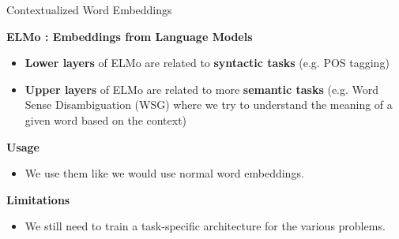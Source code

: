 \documentclass[aspectratio=169]{beamer}
\begin{document}
\begin{frame}{Contextualized Word Embeddings}

\centering
\textbf{ELMo : Embeddings from Language Models \cite{peters2018deep}}
\vspace{.3cm}

\begin{itemize}
	\item \textbf{Lower layers} of ELMo are related to \textbf{syntactic tasks} (e.g. POS tagging)
	\item \textbf{Upper layers} of ELMo are related to more \textbf{semantic tasks} (e.g. Word Sense Disambiguation (WSG) where we try to understand the meaning of a given word based on the context)
\end{itemize}

\raggedright
\textbf{Usage}

\begin{itemize}
	\item We use them like we would use normal word embeddings.
\end{itemize}

\textbf{Limitations}

\begin{itemize}
	\item We still need to train a task-specific architecture for the various problems.
\end{itemize}

\end{frame}
\end{document}
